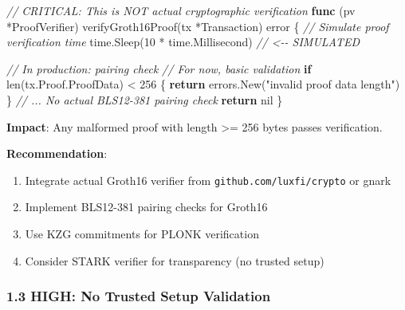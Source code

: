 \documentclass[
]{article}
\newenvironment{Shaded}{}{}
\newcommand{\BuiltInTok}[1]{\textcolor[rgb]{0.00,0.50,0.00}{#1}}
\newcommand{\CommentTok}[1]{\textcolor[rgb]{0.38,0.63,0.69}{\textit{#1}}}
\newcommand{\ControlFlowTok}[1]{\textcolor[rgb]{0.00,0.44,0.13}{\textbf{#1}}}
\newcommand{\DataTypeTok}[1]{\textcolor[rgb]{0.56,0.13,0.00}{#1}}
\newcommand{\DecValTok}[1]{\textcolor[rgb]{0.25,0.63,0.44}{#1}}
\newcommand{\KeywordTok}[1]{\textcolor[rgb]{0.00,0.44,0.13}{\textbf{#1}}}
\newcommand{\NormalTok}[1]{#1}
\newcommand{\OperatorTok}[1]{\textcolor[rgb]{0.40,0.40,0.40}{#1}}
\newcommand{\OtherTok}[1]{\textcolor[rgb]{0.00,0.44,0.13}{#1}}
\newcommand{\StringTok}[1]{\textcolor[rgb]{0.25,0.44,0.63}{#1}}
\providecommand{\tightlist}{%
  \setlength{\itemsep}{0pt}\setlength{\parskip}{0pt}}
\begin{document}
\begin{Shaded}
\begin{Highlighting}[]
\CommentTok{// CRITICAL: This is NOT actual cryptographic verification}
\KeywordTok{func} \OperatorTok{(}\NormalTok{pv }\OperatorTok{*}\NormalTok{ProofVerifier}\OperatorTok{)}\NormalTok{ verifyGroth16Proof}\OperatorTok{(}\NormalTok{tx }\OperatorTok{*}\NormalTok{Transaction}\OperatorTok{)} \DataTypeTok{error} \OperatorTok{\{}
    \CommentTok{// Simulate proof verification time}
\NormalTok{    time}\OperatorTok{.}\NormalTok{Sleep}\OperatorTok{(}\DecValTok{10} \OperatorTok{*}\NormalTok{ time}\OperatorTok{.}\NormalTok{Millisecond}\OperatorTok{)}  \CommentTok{// \textless{}{-}{-} SIMULATED}
    
    \CommentTok{// In production: pairing check}
    \CommentTok{// For now, basic validation}
    \ControlFlowTok{if} \BuiltInTok{len}\OperatorTok{(}\NormalTok{tx}\OperatorTok{.}\NormalTok{Proof}\OperatorTok{.}\NormalTok{ProofData}\OperatorTok{)} \OperatorTok{\textless{}} \DecValTok{256} \OperatorTok{\{}
        \ControlFlowTok{return}\NormalTok{ errors}\OperatorTok{.}\NormalTok{New}\OperatorTok{(}\StringTok{"invalid proof data length"}\OperatorTok{)}
    \OperatorTok{\}}
    \CommentTok{// ... No actual BLS12{-}381 pairing check}
    \ControlFlowTok{return} \OtherTok{nil}
\OperatorTok{\}}
\end{Highlighting}
\end{Shaded}

\textbf{Impact}: Any malformed proof with length \textgreater= 256 bytes
passes verification.

\textbf{Recommendation}:

\begin{enumerate}
\def\labelenumi{\arabic{enumi}.}
\tightlist
\item
  Integrate actual Groth16 verifier from
  \texttt{github.com/luxfi/crypto} or gnark
\item
  Implement BLS12-381 pairing checks for Groth16
\item
  Use KZG commitments for PLONK verification
\item
  Consider STARK verifier for transparency (no trusted setup)
\end{enumerate}

\subsubsection{1.3 HIGH: No Trusted Setup
Validation}\label{13-high-no-trusted-setup-validation}
\end{document}
